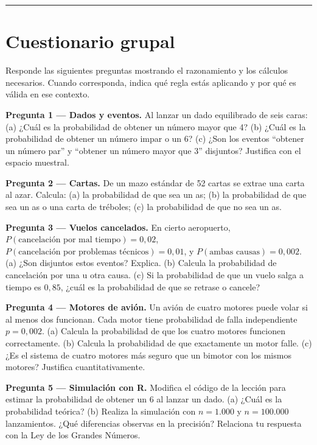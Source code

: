 \documentclass[
  spanish,
  letterpaper,
  DIV=11,
  numbers=noendperiod]{scrartcl}
\begin{document}
\begin{center}\rule{0.5\linewidth}{0.5pt}\end{center}

\section{Cuestionario grupal}\label{cuestionario-grupal}

Responde las siguientes preguntas mostrando el razonamiento y los
cálculos necesarios. Cuando corresponda, indica qué regla estás
aplicando y por qué es válida en ese contexto.

\textbf{Pregunta 1 --- Dados y eventos.} Al lanzar un dado equilibrado
de seis caras: (a) ¿Cuál es la probabilidad de obtener un número mayor
que 4? (b) ¿Cuál es la probabilidad de obtener un número impar o un 6?
(c) ¿Son los eventos ``obtener un número par'' y ``obtener un número
mayor que 3'' disjuntos? Justifica con el espacio muestral.

\textbf{Pregunta 2 --- Cartas.} De un mazo estándar de 52 cartas se
extrae una carta al azar. Calcula: (a) la probabilidad de que sea un as;
(b) la probabilidad de que sea un as o una carta de tréboles; (c) la
probabilidad de que no sea un as.

\textbf{Pregunta 3 --- Vuelos cancelados.} En cierto aeropuerto,
\(P(\text{cancelación por mal tiempo}) = 0{,}02\),
\(P(\text{cancelación por problemas técnicos}) = 0{,}01\), y
\(P(\text{ambas causas}) = 0{,}002\). (a) ¿Son disjuntos estos eventos?
Explica. (b) Calcula la probabilidad de cancelación por una u otra
causa. (c) Si la probabilidad de que un vuelo salga a tiempo es
\(0{,}85\), ¿cuál es la probabilidad de que se retrase o cancele?

\textbf{Pregunta 4 --- Motores de avión.} Un avión de cuatro motores
puede volar si al menos dos funcionan. Cada motor tiene probabilidad de
falla independiente \(p = 0{,}002\). (a) Calcula la probabilidad de que
los cuatro motores funcionen correctamente. (b) Calcula la probabilidad
de que exactamente un motor falle. (c) ¿Es el sistema de cuatro motores
más seguro que un bimotor con los mismos motores? Justifica
cuantitativamente.

\textbf{Pregunta 5 --- Simulación con R.} Modifica el código de la
lección para estimar la probabilidad de obtener un 6 al lanzar un dado.
(a) ¿Cuál es la probabilidad teórica? (b) Realiza la simulación con
\(n = 1{.}000\) y \(n = 100{.}000\) lanzamientos. ¿Qué diferencias
observas en la precisión? Relaciona tu respuesta con la Ley de los
Grandes Números.
\end{document}
